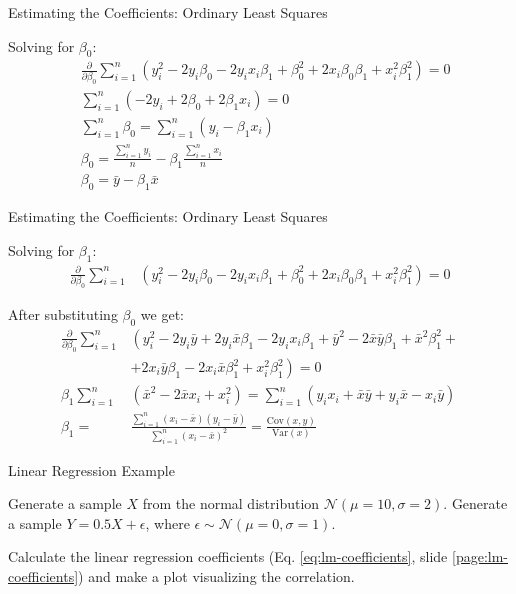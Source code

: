 \begin{frame}{Estimating the Coefficients: Ordinary Least Squares}
    
    Solving for $\beta_0$:
    \begin{align*}
    &\frac{\partial}{\partial \beta_0} \sum_{i=1}^{n} \left(
        y_i^2 - 2 y_i \beta_0 - 2 y_i x_i \beta_1 + \beta_0^2 + 2 x_i \beta_0 \beta_1 + x_i^2 \beta_1^2
    \right) = 0\\
    &\sum_{i=1}^{n} (-2y_i + 2 \beta_0 + 2\beta_1 x_i) = 0\\
    &\sum_{i=1}^{n} \beta_0 = \sum_{i=1}^{n} (y_i - \beta_1 x_i)\\
    &\beta_0 = \frac{\sum_{i=1}^{n} y_i}{n} - \beta_1 \frac{\sum_{i=1}^{n} x_i}{n}\\
    &\beta_0 = \bar{y} - \beta_1 \bar{x}
    \end{align*}    

\end{frame}

\begin{frame}{Estimating the Coefficients: Ordinary Least Squares}

    Solving for $\beta_1$:
    \begin{align*}
    \frac{\partial}{\partial \beta_0} \sum_{i=1}^{n} &\left(
        y_i^2 - 2 y_i \beta_0 - 2 y_i x_i \beta_1 + \beta_0^2 + 2 x_i \beta_0 \beta_1 + x_i^2 \beta_1^2
    \right) = 0
    \end{align*}

    After substituting $\beta_0$ we get:
    \begin{align*}
    \frac{\partial}{\partial \beta_0} \sum_{i=1}^{n} &\left(
        y_i^2 - 2y_i \bar{y} + 2y_i \bar{x} \beta_1 - 2y_i x_i \beta_1 + \bar{y}^2 -2\bar{x}\bar{y}\beta_1 + \bar{x}^2\beta_1^2 + \right.\\
        &\left. + 2x_i \bar{y}\beta_1 - 2x_i\bar{x}\beta_1^2 + x_i^2 \beta_1^2
    \right) = 0\\
    \beta_1 \sum_{i=1}^{n} &\left( \bar{x}^2 - 2\bar{x}x_i + x_i^2 \right) = \sum_{i=1}^{n} \left( y_i x_i + \bar{x}\bar{y} + y_i \bar{x} - x_i \bar{y} \right)\\
    \beta_1 = &\frac{\sum_{i=1}^{n} (x_i - \bar{x})(y_i - \bar{y})}{\sum_{i=1}^{n} (x_i - \bar{x})^2} = \frac{\text{Cov}(x,y)}{\text{Var}(x)}
    \end{align*}    

\end{frame}

\begin{frame}{Linear Regression Example}
    \begin{example}
        \medskip
        Generate a sample $X$ from the normal distribution $\mathcal{N}(\mu=10, \sigma=2)$. Generate a sample $Y = 0.5X +  \epsilon$, where $\epsilon \sim \mathcal{N}(\mu=0, \sigma=1)$. 
        
        Calculate the linear regression coefficients (Eq. \ref{eq:lm-coefficients}, slide \ref{page:lm-coefficients}) and make a plot visualizing the correlation.
    \end{example}
\end{frame}


